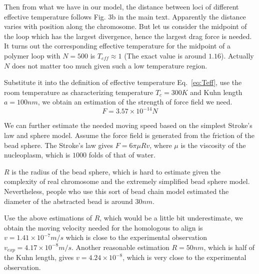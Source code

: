 \documentclass{article}
\begin{document}
Then from what we have in our model, the distance between loci of different effective temperature follows Fig. 3b in the main text.
Apparently the distance varies with position along the chromosome. 
But let us consider the midpoint of the loop which has the largest divergence, hence the largest drag force is needed.
It turns out the corresponding effective temperature for the midpoint of a polymer loop with $N=500$ is $T_{eff}\approx 1$ (The exact value is around $1.16$). 
Actually $N$ does not matter too much given such a low temperature region. 

Substitute it into the definition of effective temperature Eq.~\ref{eq:Teff}, use the room temperature as characterizing temperature $T_c = 300K$ and Kuhn length $a = 100nm$, we obtain an estimation of the strength of force field we need.
\begin{equation}
	F = 3.57\times10^{-14} N
\end{equation}

We can further estimate the needed moving speed based on the simplest Stroke's law and sphere model. 
Assume the force field is generated from the friction of the bead sphere. 
The Stroke's law gives $F= 6\pi \mu R v$, where $\mu$ is the viscosity of the nucleoplasm, which is $1000$ folds of that of water.

$R$ is the radius of the bead sphere, which is hard to estimate given the complexity of real chromosome and the extremely simplified bead sphere model.
Nevertheless, people who use this sort of bead chain model estimated the diameter of the abstracted bead is around $30nm$\cite{Rosa2008}.

Use the above estimations of $R$, which would be a little bit underestimate, we obtain the moving velocity needed for the homologous to align is $v = 1.41\times10^{-7} m/s$ which is close to the experimental observation $v_{exp} = 4.17\times10^{-8}m/s$.
Another reasonable estimation $R=50nm$, which is half of the Kuhn length, gives $v = 4.24\times10^{-8}$, which is very close to the experimental observation.
\end{document}
